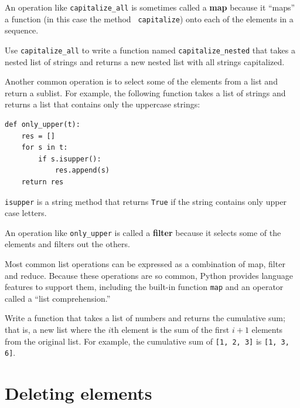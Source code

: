 \documentclass[10pt]{book}
\begin{document}
An operation like \verb"capitalize_all" is sometimes called a {\bf
map} because it ``maps'' a function (in this case the method {\tt
capitalize}) onto each of the elements in a sequence.

\begin{exercise}

Use \verb"capitalize_all" to write a function named \verb"capitalize_nested"
that takes a nested list of strings and returns a new nested list
with all strings capitalized.

\end{exercise}

Another common operation is to select some of the elements from
a list and return a sublist.  For example, the following
function takes a list of strings and returns a list that contains
only the uppercase strings:

\begin{verbatim}
def only_upper(t):
    res = []
    for s in t:
        if s.isupper():
            res.append(s)
    return res
\end{verbatim}
%
{\tt isupper} is a string method that returns {\tt True} if
the string contains only upper case letters.

An operation like \verb"only_upper" is called a {\bf filter} because
it selects some of the elements and filters out the others.

Most common list operations can be expressed as a combination
of map, filter and reduce.  Because these operations are
so common, Python provides language features to support them,
including the built-in function {\tt map} and an operator
called a ``list comprehension.''

\begin{exercise}
\label{cumulative}

Write a function that takes a list of numbers and returns the
cumulative sum; that is, a new list where the $i$th element
is the sum of the first $i+1$ elements from the original list.
For example, the cumulative sum of {\tt [1, 2, 3]} is
{\tt [1, 3, 6]}. 
\end{exercise}


\section{Deleting elements}
\end{document}
